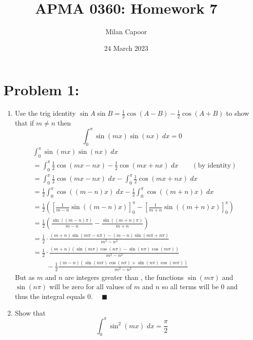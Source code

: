 \documentclass[12pt]{article}
\title{APMA 0360: Homework 7}
\author{Milan Capoor}
\date{24 March 2023}
\begin{document}
\maketitle
\vspace*{-1.2cm}
\section*{Problem 1:}
\begin{enumerate}
    \item Use the trig identity $\sin A \sin B = \frac{1}{2}\cos(A - B) - \frac{1}{2}\cos(A + B)$ to show that if $m \neq n$ then 
    \[\int_{0}^\pi \sin(mx)\sin(nx) \; dx =0\]
    \vspace*{-0.5cm}
    \color{blue}
    \begingroup 
    \allowdisplaybreaks
    \begin{align*}
        &\int_{0}^\pi \sin(mx)\sin(nx) \; dx \\
        &= \int_0^\pi \frac{1}{2}\cos(mx - nx) - \frac{1}{2}\cos(mx + nx)\; dx \qquad (\text{by identity})\\
        &= \int_0^\pi \frac{1}{2}\cos(mx - nx)\; dx - \int_0^\pi \frac{1}{2}\cos(mx + nx)\; dx\\
        &= \frac{1}{2}\int_0^\pi \cos((m-n)x)\; dx - \frac{1}{2}\int_0^\pi \cos((m+n)x)\; dx\\
        &= \frac{1}{2}\left(\left[\frac{1}{m-n}\sin((m-n)x)\right]_0^\pi - \left[\frac{1}{m+n}\sin((m+n)x)\right]_0^\pi\right)\\
        &= \frac{1}{2}\left(\frac{\sin((m- n)\pi)}{m - n} - \frac{\sin((m + n)\pi)}{m + n}\right)\\
        &= \frac{1}{2}\cdot \frac{(m + n)\sin(m\pi - n\pi) - (m -n)\sin(m\pi + n\pi)}{m^2 - n^2}\\
        &= \frac{1}{2}\cdot \frac{(m + n)(\sin(m\pi)\cos(n\pi) - \sin(n\pi)\cos(m\pi))}{m^2 - n^2}\\
        &\qquad -\frac{1}{2}\frac{(m -n)(\sin(m\pi)\cos(n\pi) + \sin(n\pi)\cos(m\pi))}{m^2 - n^2}
    \end{align*}
    But as $m$ and $n$ are integers greater than , the functions $\sin(m\pi)$ and $\sin(n\pi)$ will be zero for all values of $m$ and $n$ so all terms will be 0 and thus the integral equals 0. $\quad \blacksquare$
    \endgroup
    \color{black}
    \item Show that 
    \[\int_0^\pi \sin^2 (mx)\; dx = \frac{\pi}{2}\]
    

\end{enumerate}
\end{document}
